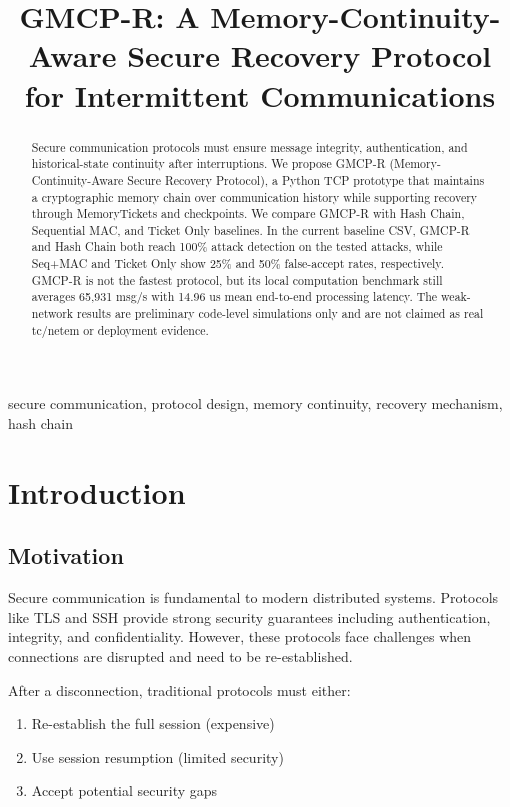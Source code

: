 \documentclass[conference]{IEEEtran}
\title{GMCP-R: A Memory-Continuity-Aware Secure Recovery Protocol for Intermittent Communications}
\author{
\IEEEauthorblockN{Junyu Wang}
\IEEEauthorblockA{School of Computer Science\\
Beijing Information Science and Technology University\\
Beijing, China\\
wangjunyu@bistu.edu.cn}
}
\begin{document}
\maketitle

\begin{abstract}
Secure communication protocols must ensure message integrity, authentication, and historical-state continuity after interruptions. We propose GMCP-R (Memory-Continuity-Aware Secure Recovery Protocol), a Python TCP prototype that maintains a cryptographic memory chain over communication history while supporting recovery through MemoryTickets and checkpoints. We compare GMCP-R with Hash Chain, Sequential MAC, and Ticket Only baselines. In the current baseline CSV, GMCP-R and Hash Chain both reach 100\% attack detection on the tested attacks, while Seq+MAC and Ticket Only show 25\% and 50\% false-accept rates, respectively. GMCP-R is not the fastest protocol, but its local computation benchmark still averages 65,931 msg/s with 14.96 us mean end-to-end processing latency. The weak-network results are preliminary code-level simulations only and are not claimed as real tc/netem or deployment evidence.
\end{abstract}

\begin{IEEEkeywords}
secure communication, protocol design, memory continuity, recovery mechanism, hash chain
\end{IEEEkeywords}

\section{Introduction}

\subsection{Motivation}

Secure communication is fundamental to modern distributed systems. Protocols like TLS and SSH provide strong security guarantees including authentication, integrity, and confidentiality. However, these protocols face challenges when connections are disrupted and need to be re-established.

After a disconnection, traditional protocols must either:
\begin{enumerate}
\item Re-establish the full session (expensive)
\item Use session resumption (limited security)
\item Accept potential security gaps
\end{enumerate}
\end{document}
